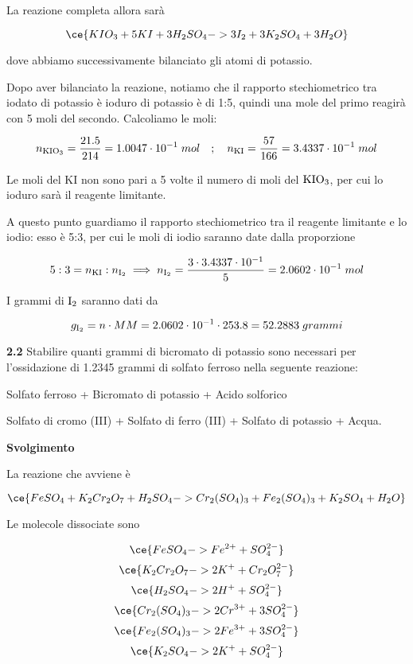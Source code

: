 La reazione completa allora sarà

$$\ce{KIO_3 + 5KI + 3H_2SO_4 -> 3I_2 + 3K_2SO_4 + 3H_2O}$$

dove abbiamo successivamente bilanciato gli atomi di potassio.

Dopo aver bilanciato la reazione, notiamo che il rapporto stechiometrico tra iodato di potassio è ioduro di potassio è di 1:5, quindi una mole del primo reagirà con 5 moli del secondo. Calcoliamo le moli:

$$n_{\rm KIO_3}=\frac{21.5}{214}=1.0047 \cdot 10^{-1}\;mol
\quad;\quad
n_{\rm KI}=\frac{57}{166}=3.4337 \cdot 10^{-1}\;mol$$

Le moli del KI non sono pari a 5 volte il numero di moli del $\rm KIO_3$, per cui lo ioduro sarà il reagente limitante.

A questo punto guardiamo il rapporto stechiometrico tra il reagente limitante e lo iodio: esso è 5:3, per cui le moli di iodio saranno date dalla proporzione

$$5:3=n_{\rm KI}:n_{\rm I_2}
\implies
n_{\rm I_2}=\frac{3 \cdot 3.4337 \cdot 10^{-1}}{5}=2.0602 \cdot 10^{-1}\;mol$$

I grammi di $\rm I_2$ saranno dati da

$$g_{\rm I_2}=n \cdot MM
=2.0602 \cdot 10^{-1} \cdot 253.8
=52.2883\;grammi$$


\vspace{0.2cm}\textbf{2.2} Stabilire quanti grammi di bicromato di potassio sono necessari per l'ossidazione di 1.2345 grammi di solfato ferroso nella seguente reazione:

\begin{center}
    Solfato ferroso + Bicromato di potassio + Acido solforico \ce{->}
    
    \ce{->} Solfato di cromo (III) + Solfato di ferro (III) + Solfato di potassio + Acqua.   
\end{center}

\large\textbf{Svolgimento}\normalsize

\vspace{0.2cm}La reazione che avviene è

$$\ce{FeSO_4 + K_2Cr_2O_7 + H_2SO_4 -> Cr_2(SO_4)_3 + Fe_2(SO_4)_3 + K_2SO_4 + H_2O}$$

Le molecole dissociate sono

$$\ce{FeSO_4 -> Fe^{2+} + SO_4^{2-}}$$
$$\ce{K_2Cr_2O_7 -> 2K^+ + Cr_2O_7^{2-}}$$
$$\ce{H_2SO_4 -> 2H^+ + SO_4^{2-}}$$
$$\ce{Cr_2(SO_4)_3 -> 2Cr^{3+} + 3SO_4^{2-}}$$
$$\ce{Fe_2(SO_4)_3 -> 2Fe^{3+} + 3SO_4^{2-}}$$
$$\ce{K_2SO_4 -> 2K^+ + SO_4^{2-}}$$

